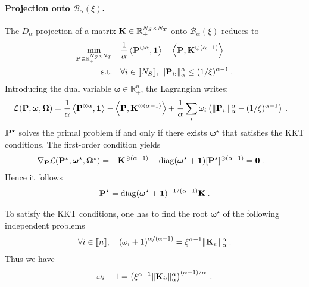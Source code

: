     \paragraph{Projection onto $\mathcal{B}_\alpha(\xi)$.} The $D_\alpha$ projection of a matrix ${\mathbf{K}} \in \mathbb{R}_+^{N_S \times N_T}$ onto $\mathcal{B}_\alpha(\xi)$ reduces to
    \begin{align}
        \min_{{\mathbf{P}} \in \mathbb{R}_+^{N_S \times N_T}} \quad &\frac{1}{\alpha}\left\langle {\mathbf{P}}^{\odot \alpha}, \bm{1} \right\rangle - \left\langle {\mathbf{P}}, {\mathbf{K}}^{\odot (\alpha-1)} \right\rangle \\
        \text{s.t.} \quad
        &\forall i \in {[\![N_S]\!]}, \: \|{\mathbf{P}}_{i:} \|_\alpha^\alpha \leq (1/\xi)^{\alpha-1} \:.
    \end{align}
    Introducing the dual variable $\bm{\omega} \in \mathbb{R}_+^n$, the Lagrangian writes:
    \begin{align}
        \mathcal{L}({\mathbf{P}}, \bm{\omega}, \bm{\Omega}) &=  \frac{1}{\alpha}\left\langle {\mathbf{P}}^{\odot \alpha}, \bm{1} \right\rangle - \left\langle {\mathbf{P}}, {\mathbf{K}}^{\odot (\alpha-1)} \right\rangle + \frac{1}{\alpha} \sum_i \omega_i \left(\|{\mathbf{P}}_{i:}\|_{\alpha}^{\alpha} - (1/\xi)^{\alpha-1} \right) \:.
    \end{align}
    ${\mathbf{P}}^\star$ solves the primal problem if and only if there exists $\bm{\omega}^\star$ that satisfies the KKT conditions.
    The first-order condition yields
    \begin{align}
        \nabla_{{\mathbf{P}}} \mathcal{L} ({\mathbf{P}}^\star, \bm{\omega}^\star, \bm{\Omega}^\star) &= - {\mathbf{K}}^{\odot(\alpha-1)} + \operatorname{diag}(\bm{\omega}^\star + \bm{1})[{\mathbf{P}}^\star]^{\odot (\alpha - 1)} = \bm{0} \:.
    \end{align}
    Hence it follows
    \begin{align}
        {\mathbf{P}}^\star = \operatorname{diag}(\bm{\omega}^\star + \bm{1})^{-1/(\alpha-1)}\mathbf{K} \:.
    \end{align}
    
    
    To satisfy the KKT conditions, one has to find the root $\bm{\omega}^\star$ of the following independent problems 
    \begin{align}
        \forall i \in {[\![n]\!]}, \quad \left(\omega_i + 1 \right)^{\alpha / (\alpha-1)} =  \xi^{\alpha-1} \|{\mathbf{K}}_{i:}\|_\alpha^\alpha \:.
    \end{align}
    Thus we have 
    \begin{align}
        \omega_i + 1 = \left(\xi^{\alpha-1} \|{\mathbf{K}}_{i:}\|_\alpha^\alpha \right)^{(\alpha-1) / \alpha} \:.
    \end{align}


